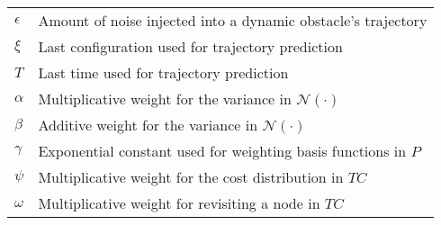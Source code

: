 \begin{table}[h!]
\begin{tabular}{l|l}
    $\epsilon$                                 & Amount of noise injected into a dynamic obstacle's trajectory                        \\
    $\xi$                                      & Last configuration used for trajectory prediction                                    \\
    $T$                                                 & Last time used for trajectory prediction                                             \\
    $\alpha$                                   & Multiplicative weight for the variance in $\mathcal{N}(\cdot)$ \\
    $\beta$                                    & Additive weight for the variance in $\mathcal{N}(\cdot)$       \\
    $\gamma$                                   & Exponential constant used for weighting basis functions in $P$                     \\
    $\psi$                                     & Multiplicative weight for the cost distribution in $TC$                            \\
    $\omega$                                   & Multiplicative weight for revisiting a node in $TC$                                \\
    \end{tabular}
\end{table}


